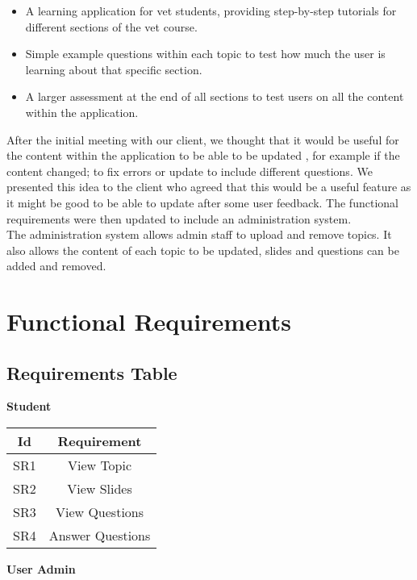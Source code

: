 \documentclass{l3proj}
\begin{document}
\begin{itemize}
\item A learning application for vet students, providing step-by-step tutorials for different sections of the vet course.
\item Simple example questions within each topic to test how much the user is learning about that specific section.
\item A larger assessment at the end of all sections to test users on all the content within the application.
\end{itemize}

After the initial meeting with our client, we thought that it would be useful for the content within the application to be able to be updated , for example if the content changed; to fix errors or update to include different questions. We presented this idea to the client who agreed that this would be a useful feature as it might be good to be able to update after some user feedback. The functional requirements were then updated to include an administration system.\\
The administration system allows admin staff to upload and remove topics. It also allows the content of each topic to be updated, slides and questions can be added and removed.


\section{Functional Requirements}

\subsection{Requirements Table}

\textbf{Student}\\

\begin{center}
\begin{tabular}{|c|c|}
\hline \textbf{Id} & \textbf{Requirement}\\
\hline SR1 & View Topic\\
\hline SR2 & View Slides\\
\hline SR3 & View Questions\\
\hline SR4 & Answer Questions\\
\hline 
\end{tabular}
\end{center}

\textbf{User Admin}\\
\end{document}
